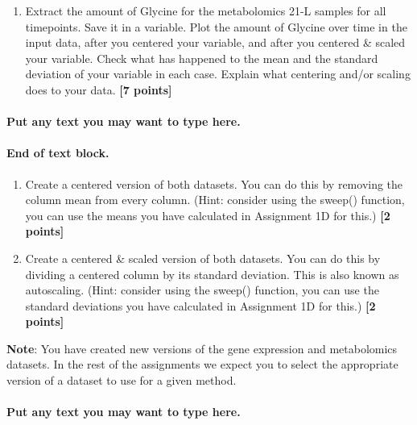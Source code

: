\documentclass[
]{article}
\providecommand{\tightlist}{%
  \setlength{\itemsep}{0pt}\setlength{\parskip}{0pt}}
\begin{document}
\begin{enumerate}
\def\labelenumi{\Alph{enumi})}
\setcounter{enumi}{4}
\tightlist
\item
  Extract the amount of Glycine for the metabolomics 21-L samples for
  all timepoints. Save it in a variable. Plot the amount of Glycine over
  time in the input data, after you centered your variable, and after
  you centered \& scaled your variable. Check what has happened to the
  mean and the standard deviation of your variable in each case. Explain
  what centering and/or scaling does to your data. \textbf{{[}7
  points{]}}
\end{enumerate}

\hypertarget{put-any-text-you-may-want-to-type-here.-3}{%
\paragraph{Put any text you may want to type
here.}\label{put-any-text-you-may-want-to-type-here.-3}}

\hypertarget{end-of-text-block.-5}{%
\paragraph{\texorpdfstring{End of text block.\\
}{End of text block. }}\label{end-of-text-block.-5}}

\begin{enumerate}
\def\labelenumi{\Alph{enumi})}
\setcounter{enumi}{5}
\item
  Create a centered version of both datasets. You can do this by
  removing the column mean from every column. (Hint: consider using the
  sweep() function, you can use the means you have calculated in
  Assignment 1D for this.) \textbf{{[}2 points{]}}
\item
  Create a centered \& scaled version of both datasets. You can do this
  by dividing a centered column by its standard deviation. This is also
  known as autoscaling. (Hint: consider using the sweep() function, you
  can use the standard deviations you have calculated in Assignment 1D
  for this.) \textbf{{[}2 points{]}}
\end{enumerate}

\textbf{Note}: You have created new versions of the gene expression and
metabolomics datasets. In the rest of the assignments we expect you to
select the appropriate version of a dataset to use for a given method.

\hypertarget{put-any-text-you-may-want-to-type-here.-4}{%
\paragraph{Put any text you may want to type
here.}\label{put-any-text-you-may-want-to-type-here.-4}}
\end{document}
